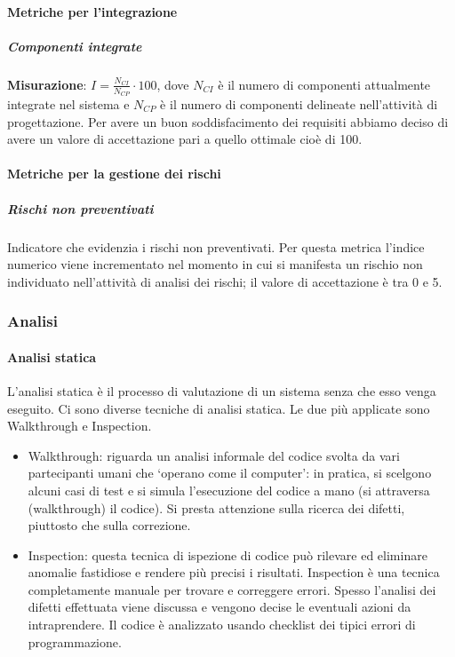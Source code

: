 \paragraph{Metriche per l'integrazione}
\subparagraph{Componenti integrate}
\textbf{Misurazione}: $I=\frac{N_{CI}}{N_{CP}} \cdot 100$, dove $N_{CI}$ è il numero di componenti attualmente integrate nel sistema e $N_{CP}$ è il numero di componenti delineate nell'attività di progettazione.
Per avere un buon soddisfacimento dei requisiti abbiamo deciso di avere un valore di accettazione pari a quello ottimale cioè di 100.

\paragraph{Metriche per la gestione dei rischi}

\subparagraph{Rischi non preventivati}
Indicatore che evidenzia i rischi non preventivati.
Per questa metrica l'indice numerico viene incrementato nel momento in cui si manifesta un rischio non individuato nell’attività di analisi dei rischi; il valore di accettazione è tra 0 e 5.

\subsubsection{Analisi}

\paragraph{Analisi statica}


L’analisi statica è il processo di valutazione di un sistema senza che esso venga eseguito. Ci sono diverse tecniche di analisi statica. Le due più applicate sono Walkthrough e Inspection.
\begin{itemize}
\item  Walkthrough: riguarda un analisi informale del codice svolta da vari partecipanti umani che ‘operano come il computer’: in pratica, si scelgono alcuni casi di test e si simula
l’esecuzione del codice a mano (si attraversa (walkthrough) il codice). Si presta attenzione sulla ricerca dei difetti, piuttosto che sulla correzione.

\item  Inspection: questa tecnica di ispezione di codice può rilevare
  ed eliminare anomalie fastidiose e rendere più precisi i
  risultati. Inspection è una tecnica completamente manuale per
  trovare e correggere errori. Spesso l’analisi dei difetti effettuata
  viene discussa e vengono decise le eventuali azioni da
  intraprendere. Il codice è analizzato usando checklist dei tipici
  errori di programmazione.  
\end{itemize}

